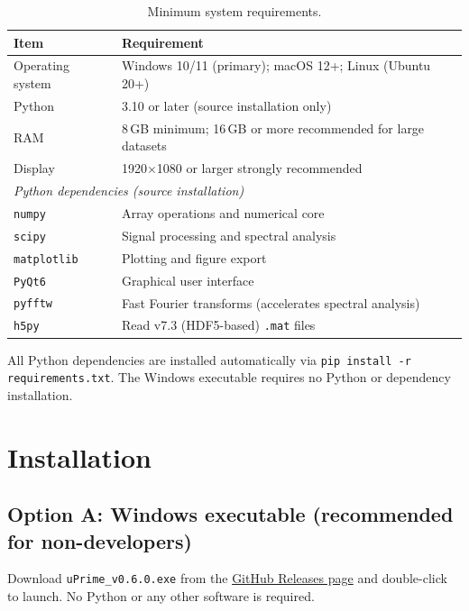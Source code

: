 \documentclass[11pt, a4paper]{report}
\begin{document}
\begin{table}[htbp]
\centering
\caption{Minimum system requirements.}
\begin{tabular}{ll}
\toprule
\textbf{Item} & \textbf{Requirement} \\
\midrule
Operating system  & Windows 10/11 (primary); macOS 12+; Linux (Ubuntu 20+) \\
Python            & 3.10 or later (source installation only) \\
RAM               & 8\,GB minimum; 16\,GB or more recommended for large datasets \\
Display           & 1920$\times$1080 or larger strongly recommended \\
\midrule
\multicolumn{2}{l}{\textit{Python dependencies (source installation)}} \\
\midrule
\texttt{numpy}      & Array operations and numerical core \\
\texttt{scipy}      & Signal processing and spectral analysis \\
\texttt{matplotlib} & Plotting and figure export \\
\texttt{PyQt6}      & Graphical user interface \\
\texttt{pyfftw}     & Fast Fourier transforms (accelerates spectral analysis) \\
\texttt{h5py}       & Read v7.3 (HDF5-based) \texttt{.mat} files \\
\bottomrule
\end{tabular}
\end{table}

\begin{notebox}
All Python dependencies are installed automatically via \texttt{pip install -r requirements.txt}. The Windows executable requires no Python or dependency installation.
\end{notebox}

\section{Installation}

\subsection{Option A: Windows executable (recommended for non-developers)}

Download \texttt{uPrime\_v0.6.0.exe} from the
\href{https://github.com/CmdrRyder/uPrime/releases}{GitHub Releases page}
and double-click to launch. No Python or any other software is required.
\end{document}
